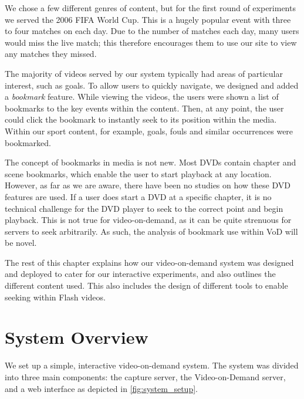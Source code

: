 We chose a few different genres of content, but for the first round of experiments we served the 2006 FIFA World Cup. This is a hugely popular event with three to four matches on each day. Due to the number of matches each day, many users would miss the live match; this therefore encourages them to use our site to view any matches they missed.

The majority of videos served by our system typically had areas of particular interest, such as goals. To allow users to quickly navigate, we designed and added a \emph{bookmark} feature. While viewing the videos, the users were shown a list of bookmarks to the key events within the content. Then, at any point, the user could click the bookmark to instantly seek to its position within the media. Within our sport content, for example, goals, fouls and similar occurrences were bookmarked.

The concept of bookmarks in media is not new. Most DVDs contain chapter and scene bookmarks, which enable the user to start playback at any location. However, as far as we are aware, there have been no studies on how these DVD features are used. If a user does start a DVD at a specific chapter, it is no technical challenge for the DVD player to seek to the correct point and begin playback. This is not true for video-on-demand, as it can be quite strenuous for servers to seek arbitrarily. As such, the analysis of bookmark use within VoD will be novel.

The rest of this chapter explains how our video-on-demand system was designed and deployed to cater for our interactive experiments, and also outlines the different content used. This also includes the design of different tools to enable seeking within Flash videos.

\section{System Overview}

We set up a simple, interactive video-on-demand system. The system was divided into three main components: the capture server, the Video-on-Demand server, and a web interface as depicted in \autoref{fig:system_setup}.



